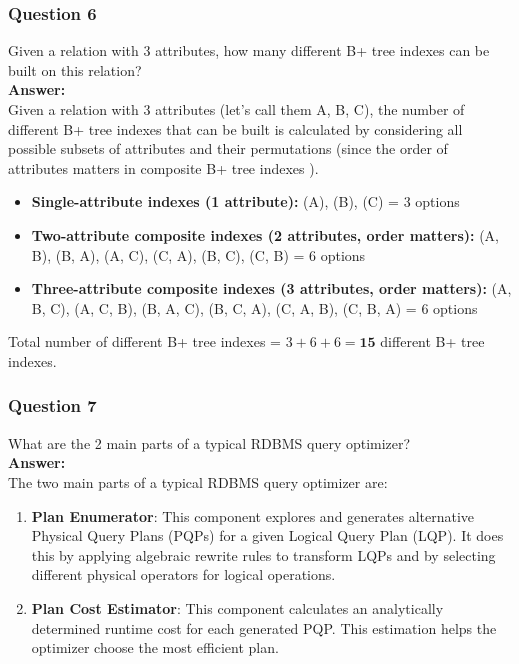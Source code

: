 \documentclass{article}
\begin{document}
\subsubsection*{Question 6}
Given a relation with 3 attributes, how many different B+ tree indexes can be built on this relation?\\

\textbf{Answer:}\\

Given a relation with 3 attributes (let's call them A, B, C), the number of different B+ tree indexes that can be built is calculated by considering all possible subsets of attributes and their permutations (since the order of attributes matters in composite B+ tree indexes ).\\

\begin{itemize}
    \item \textbf{Single-attribute indexes (1 attribute):}
        (A), (B), (C) = 3 options
    \item \textbf{Two-attribute composite indexes (2 attributes, order matters):}
        (A, B), (B, A), (A, C), (C, A), (B, C), (C, B) = 6 options
    \item \textbf{Three-attribute composite indexes (3 attributes, order matters):}
        (A, B, C), (A, C, B), (B, A, C), (B, C, A), (C, A, B), (C, B, A) = 6 options
\end{itemize}

Total number of different B+ tree indexes = $3 + 6 + 6 = \textbf{15}$ different B+ tree indexes.\\

\subsubsection*{Question 7}

What are the 2 main parts of a typical RDBMS query optimizer?\\

\textbf{Answer:}\\

The two main parts of a typical RDBMS query optimizer are:\\

\begin{enumerate}
    \item \textbf{Plan Enumerator}: This component explores and generates alternative Physical Query Plans (PQPs) for a given Logical Query Plan (LQP). It does this by applying algebraic rewrite rules to transform LQPs and by selecting different physical operators for logical operations.
    \item \textbf{Plan Cost Estimator}: This component calculates an analytically determined runtime cost for each generated PQP. This estimation helps the optimizer choose the most efficient plan.
\end{enumerate}
\end{document}
